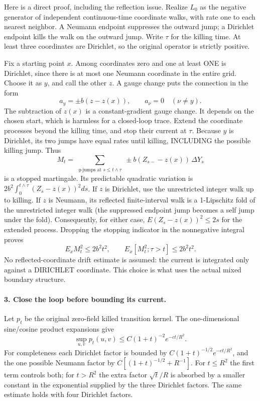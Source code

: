 \documentclass[11pt]{article}
\begin{document}
Here is a direct proof, including the reflection issue. Realize $L_0$
as the negative generator of independent continuous-time coordinate walks,
with rate one to each nearest neighbor. A Neumann endpoint suppresses the
outward jump; a Dirichlet endpoint kills the walk on the outward jump.
Write $\tau$ for the killing time. At least three coordinates are
Dirichlet, so the original operator is strictly positive.

Fix a starting point $x$. Among coordinates zero and one at least ONE is
Dirichlet, since there is at most one Neumann coordinate in the entire
grid. Choose it as $y$, and call the other $z$. A gauge change puts the
connection in the form
\[
 a_y=\pm b(z-z(x)),\qquad a_\nu=0\quad(\nu\ne y).                  \tag{3}
\]
The subtraction of $z(x)$ is a constant-gradient gauge change. It depends
on the chosen start, which is harmless for a closed-loop trace.
Extend the coordinate processes beyond the killing time, and stop their
current at $\tau$. Because $y$ is Dirichlet, its two jumps have equal
rates until killing, INCLUDING the possible killing jump. Thus
\[
 M_t=\sum_{\substack{y\text{-jumps at }s\le t\wedge\tau}}
             \pm b(Z_{s-}-z(x))\,\Delta Y_s
\]
is a stopped martingale. Its predictable quadratic variation is
$2b^2\int_0^{t\wedge\tau}(Z_s-z(x))^2ds$.
If $z$ is Dirichlet, use the unrestricted integer walk up to killing.
If $z$ is Neumann, its reflected finite-interval walk is a 1-Lipschitz
fold of the unrestricted integer walk (the suppressed endpoint jump
becomes a self jump under the fold). Consequently, for either case,
$E(Z_s-z(x))^2\le2s$ for the extended process. Dropping the stopping
indicator in the nonnegative integral proves
\[
 E_x M_t^2\le 2b^2t^2,
 \qquad E_x[M_t^2;\tau>t]\le2b^2t^2.                              \tag{4}
\]
No reflected-coordinate drift estimate is assumed: the current is
integrated only against a DIRICHLET coordinate. This choice is what uses
the actual mixed boundary structure.

\paragraph{3. Close the loop before bounding its current.}
Let $p_t$ be the original zero-field killed transition kernel. The
one-dimensional sine/cosine product expansions give
\[
 \sup_{u,v}p_t(u,v)\le C(1+t)^{-2}e^{-ct/R^2}.                     \tag{5}
\]
For completeness each Dirichlet factor is bounded by
$C(1+t)^{-1/2}e^{-ct/R^2}$, and the one possible Neumann factor by
$C[(1+t)^{-1/2}+R^{-1}]$. For $t\le R^2$ the first term controls both;
for $t>R^2$ the extra factor $\sqrt{t}/R$ is absorbed by a smaller
constant in the exponential supplied by the three Dirichlet factors.
The same estimate holds with four Dirichlet factors.
\end{document}

